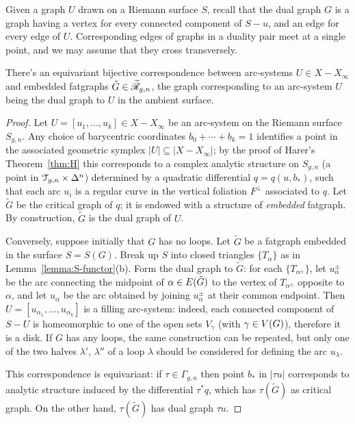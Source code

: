 Given a graph $U$ drawn on a Riemann surface $S$, recall that the dual
graph $G$ is a graph having a vertex for every connected component of
$S - u$, and an edge for every edge of $U$.  Corresponding edges of
graphs in a duality pair meet at a single point, and we may assume
that they cross transversely.
\begin{lemma}
  \label{lemma:arcs-to-rg}
  There's an equivariant bijective correspondence between arc-systems
  $U \in X - X_\infty$ and embedded fatgraphs ${\tilde G} \in \mathscr{\widetilde R}_{g,n}$,
  the graph corresponding to an arc-system $U$ being the dual graph to
  $U$ in the ambient surface.
\end{lemma}
\begin{proof}
  Let $U = [u_1, \ldots, u_k] \in X - X_\infty$ be an arc-system on the Riemann
  surface $S_{g,n}$.  Any choice of barycentric coordinates $b_0 + \cdots +
  b_k = 1$ identifies a point in the associated geometric
  symplex $|U| \subseteq |X - X_\infty|$; by the proof of Harer's Theorem~\ref{thm:H}
  this corresponds to a complex analytic structure on $S_{g,n}$ (a
  point in $\mathcal{T}_{g,n} \times \Delta^n$) determined by a quadratic differential $q
  = q(u, b_*)$, such that each arc $u_i$ is a regular curve in the
  vertical foliation $F^\perp$ associated to $q$.  Let ${\tilde G}$ be the
  critical graph of $q$; it is endowed with a structure of
  \emph{embedded} fatgraph.  By construction, ${\tilde G}$ is the
  dual graph of $U$.

  Conversely, suppose initially that $G$ has no loops.  Let ${\tilde
    G}$ be a fatgraph embedded in the surface $S = S(G)$.  Break up
  $S$ into closed triangles $\{ T_\alpha \}$ as in
  Lemma~\ref{lemma:S-functor}(b).  Form the dual graph to ${\tilde G}$:
  for each $\{ T_{\alpha^\pm} \}$, let $u_\alpha^\pm$ be the arc
  connecting the midpoint of $\alpha \in E({\tilde G})$ to the
  vertex of $T_{\alpha^\pm}$ opposite to $\alpha$, and let $u_\alpha$
  be the arc obtained by joining $u_\alpha^\pm$ at their common
  endpoint.  Then $U = [u_{\alpha_1}, \ldots, u_{\alpha_k}]$ is a
  filling arc-system: indeed, each connected component of $S - U$ is
  homeomorphic to one of the open sets $V_\gamma$ (with $\gamma \in
  V(G)$), therefore it is a disk.
  If $G$ has any loops, the same construction can be repeated, but
  only one of the two halves $\lambda'$, $\lambda''$ of a loop
  $\lambda$ should be  considered for defining the arc $u_\lambda$.

  This correspondence is equivariant: if $\tau \in \Gamma_{g,n}$ then point
  $b_*$ in $|\tau u|$ corresponds to analytic structure induced by the
  differential $\tau^*q$, which has $\tau({\tilde G})$ as critical graph.
  On the other hand, $\tau({\tilde G})$ has dual graph $\tau u$.
\end{proof}

